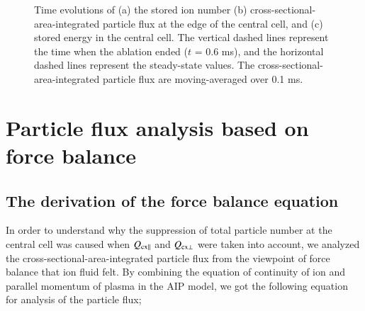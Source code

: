 \documentclass{jasse}%
\begin{document}
\begin{figure}
    \centering
    
    \caption{Time evolutions of (a) the stored ion number 
    (b) cross-sectional-area-integrated particle flux at the edge of the central cell, and (c)  stored energy in the central cell. 
    The vertical dashed lines represent the time when the ablation ended 
    ($t$ = 0.6 ms), and the horizontal dashed lines represent 
    the steady-state values. The cross-sectional-area-integrated particle flux are moving-averaged over 0.1 ms.} \label{fig_time_evol_E_num}
\end{figure}

\section{Particle flux analysis based on force balance} \label{analyze}
\subsection{The derivation of the force balance equation}
In order to understand why the suppression of total particle number at the central cell was caused when $Q_{\rm{cx}\parallel}$ and $Q_{\rm{cx}\bot}$ were taken into account, we analyzed the cross-sectional-area-integrated particle flux from the viewpoint of force balance that ion fluid felt. By combining the equation of continuity of ion and parallel momentum of plasma in the AIP model, we got the following equation for analysis of the particle flux;
\end{document}
